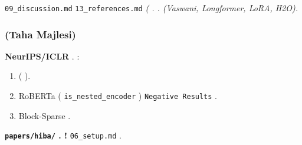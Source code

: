   \texttt{09\_discussion.md}   \texttt{13\_references.md}
\textit{(                                                                       .                                                                                                                .                                                                   (Vaswani, Longformer, LoRA, H2O).}



\subsubsection{(Taha Majlesi)}

                  \textbf{                                    NeurIPS/ICLR}                   .           :
\begin{enumerate}
\item (                     ).
\item RoBERTa (      \texttt{is\_nested\_encoder}        )                                    \texttt{Negative Results}                .
\item Block-Sparse                   .

\end{enumerate}
\textbf{                             \texttt{papers/hiba/}         .                                      !}                  \texttt{06\_setup.md}                                                                                                  .